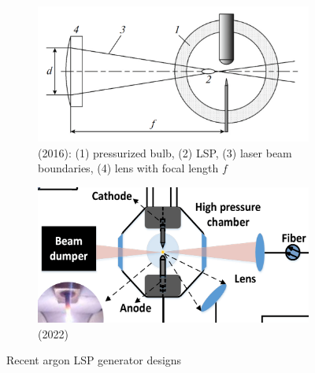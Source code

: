             \begin{figure}[h]
                \centering
                \begin{subfigure}[t]{0.47\textwidth}
                    \centering
                    \includegraphics[width=\textwidth]{assets/2 background/zimakov.png}
                    \caption{\textcite{zimakovInteractionNearIRLaser2016} (2016): (1) pressurized bulb, (2) LSP, (3) laser beam boundaries, (4) lens with focal length $f$}
                    \label{fig:recentLSPsystems_zimakov}
                \end{subfigure}
                \hfill
                \begin{subfigure}[t]{0.47\textwidth}
                    \centering
                    \includegraphics[width=\textwidth]{assets/2 background/LuYuanSongetal.png}
                    \caption{\textcite{luCharacteristicDiagnosticsLaserStabilized2022} (2022)}
                    \label{fig:recentLSPsystems_lu}
                \end{subfigure}
                \caption{Recent argon LSP generator designs}
                \label{fig:recentLSPsystems}
            \end{figure}

